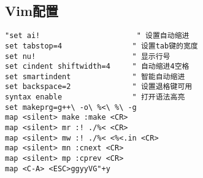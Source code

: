 \subsection{Vim配置}
\begin{verbatim}
"set ai!                      " 设置自动缩进
set tabstop=4                " 设置tab键的宽度
set nu!                      " 显示行号
set cindent shiftwidth=4     " 自动缩进4空格
set smartindent              " 智能自动缩进
set backspace=2              " 设置退格键可用
syntax enable                " 打开语法高亮
set makeprg=g++\ -o\ %<\ %\ -g
map <silent> make :make <CR>
map <silent> mr :! ./%< <CR>
map <silent> mw :! ./%< <%<.in <CR>
map <silent> mn :cnext <CR>
map <silent> mp :cprev <CR>
map <C-A> <ESC>ggyyVG"+y
\end{verbatim}
